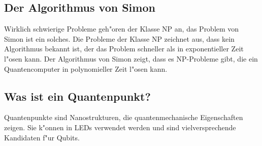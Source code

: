 \subsection{Der Algorithmus von Simon}
Wirklich schwierige Probleme geh"oren der Klasse NP an, das Problem
von Simon ist ein solches. Die Probleme der Klasse NP zeichnet aus,
dass kein Algorithmus bekannt ist, der das Problem schneller als
in exponentieller Zeit l"osen kann. Der Algorithmus von Simon zeigt,
dass es NP-Probleme gibt, die ein Quantencomputer in polynomieller
Zeit l"osen kann.

\subsection{Was ist ein Quantenpunkt?}
Quantenpunkte sind Nanostrukturen, die quantenmechanische Eigenschaften
zeigen. Sie k"onnen in LEDs verwendet werden und sind  vielversprechende
Kandidaten f"ur Qubits.

